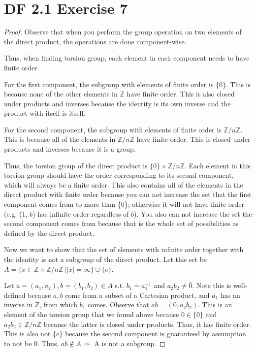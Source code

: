 \documentclass{article}
\begin{document}
\section{DF 2.1 Exercise 7}
\begin{proof}
Observe that when you perform the group operation on two elements of the direct product, the operations are done component-wise.

Thus, when finding torsion group, each element in each component needs to have finite order.

For the first component, the subgroup with elements of finite order is $\{0\}$. This is because none of the other elements in $\mathbb{Z}$ have finite order. This is also closed under products and inverses because the identity is its own inverse and the product with itself is itself.

For the second component, the subgroup with elements of finite order is $\mathbb{Z}/n\mathbb{Z}$. This is because all of the elements in $\mathbb{Z}/n\mathbb{Z}$ have finite order. This is closed under products and inverses because it is a group.

Thus, the torsion group of the direct product is $\{0\} \times \mathbb{Z}/n\mathbb{Z}$. Each element in this torsion group should have the order corresponding to its second component, which will always be a finite order. This also contains all of the elements in the direct product with finite order because you can not increase the set that the first component comes from to more than \{0\}; otherwise it will not have finite order (e.g. (1, $b$) has infinite order regardless of $b$). You also can not increase the set the second component comes from because that is the whole set of possibilities as defined by the direct product.

Now we want to show that the set of elements with infinite order together with the identity is not a subgroup of the direct product. Let this set be $A=\{x \in \mathbb{Z} \times \mathbb{Z}/n\mathbb{Z}\ | |x| = \infty \} \cup \{e\}$.

Let $a=(a_1, a_2), b=(b_1, b_2) \in A$ s.t. $b_1 = a_1^{-1}$ and $a_2b_2 \neq \bar{0}$. Note this is well-defined because $a,b$ come from a subset of a Cartesian product, and $a_1$ has an inverse in $\mathbb{Z}$, from which $b_1$ comes. Observe that $ab=(0, a_2b_2)$. This is an element of the torsion group that we found above because $0 \in \{0\}$ and $a_2b_2 \in \mathbb{Z}/n\mathbb{Z}$ because the latter is closed under products. Thus, it has finite order. This is also not $\{e\}$ because the second component is guaranteed by assumption to not be $\bar{0}$. Thus, $ab \not\in A \Rightarrow$ A is not a subgroup.
\end{proof}
\end{document}
